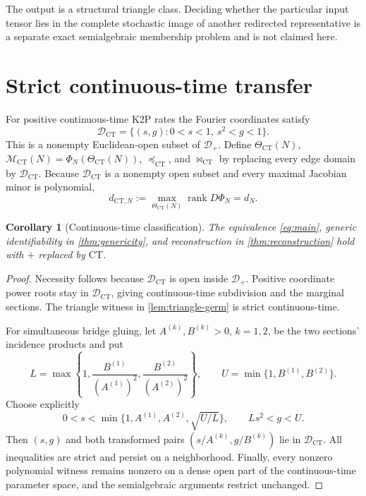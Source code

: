\documentclass[11pt]{article}
\newtheorem{corollary}[theorem]{Corollary}
\theoremstyle{remark}
\newcommand{\M}{\mathcal M}
\newcommand{\Dplus}{\mathcal D_+}
\newcommand{\Dct}{\mathcal D_{\mathrm{CT}}}
\newcommand{\preceqct}{\preceq_{\mathrm{CT}}}
\newcommand{\bowtiect}{\mathbin{\bowtie}_{\mathrm{CT}}}
\newcommand{\1}{\mathbf 1}
\begin{document}
The output is a structural triangle class.  Deciding whether the particular
input tensor lies in the complete stochastic image of another redirected
representative is a separate exact semialgebraic membership problem and is not
claimed here.

\section{Strict continuous-time transfer}\label{sec:ct}

For positive continuous-time K2P rates the Fourier coordinates satisfy
\begin{equation}\label{eq:Dct}
 \Dct=\{(s,g):0<s<1,\ s^2<g<1\}.
\end{equation}
This is a nonempty Euclidean-open subset of \(\Dplus\).  Define
\(\Theta_{\mathrm{CT}}(N)\), \(\M_{\mathrm{CT}}(N)
=\Phi_N(\Theta_{\mathrm{CT}}(N))\), \(\preceqct\), and \(\bowtiect\) by
replacing every edge domain by \(\Dct\).  Because \(\Dct\) is a nonempty
open subset and every maximal Jacobian minor is polynomial,
\[
 d_{\mathrm{CT},N}:=\max_{\Theta_{\mathrm{CT}}(N)}
 \operatorname{rank}D\Phi_N=d_N.
\]

\begin{corollary}[Continuous-time classification]\label{cor:ct}
The equivalence \eqref{eq:main}, generic identifiability in
\cref{thm:genericity}, and reconstruction in \cref{thm:reconstruction} hold
with \(+\) replaced by \(\mathrm{CT}\).
\end{corollary}

\begin{proof}
Necessity follows because \(\Dct\) is open inside \(\Dplus\).  Positive
coordinate power roots stay in \(\Dct\), giving continuous-time subdivision
and the marginal sections.  The triangle witness in
\cref{lem:triangle-germ} is strict continuous-time.

For simultaneous bridge gluing, let \(A^{(k)},B^{(k)}>0\), \(k=1,2\), be
the two sections' incidence products and put
\[
 L=\max\left\{1,\frac{B^{(1)}}{(A^{(1)})^2},
                  \frac{B^{(2)}}{(A^{(2)})^2}\right\},\qquad
 U=\min\{1,B^{(1)},B^{(2)}\}.
\]
Choose explicitly
\[
 0<s<\min\{1,A^{(1)},A^{(2)},\sqrt{U/L}\},
 \qquad Ls^2<g<U.
\]
Then \((s,g)\) and both transformed pairs
\((s/A^{(k)},g/B^{(k)})\) lie in \(\Dct\).  All inequalities are strict and
persist on a neighborhood.  Finally, every nonzero polynomial witness remains
nonzero on a dense open part of the continuous-time parameter space, and the
semialgebraic arguments restrict unchanged.
\end{proof}
\end{document}
